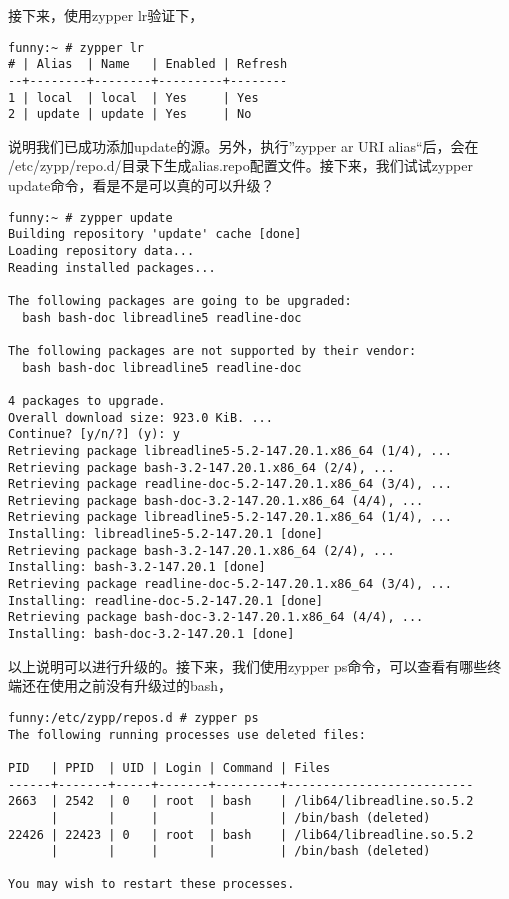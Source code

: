 接下来，使用zypper lr验证下，

\small{
\begin{verbatim}
funny:~ # zypper lr
# | Alias  | Name   | Enabled | Refresh
--+--------+--------+---------+--------
1 | local  | local  | Yes     | Yes    
2 | update | update | Yes     | No
\end{verbatim}
}
\normalsize

说明我们已成功添加update的源。另外，执行”zypper ar URI alias“后，会在
/etc/zypp/repo.d/目录下生成alias.repo配置文件。接下来，我们试试zypper
update命令，看是不是可以真的可以升级？

\small{
\begin{verbatim}
funny:~ # zypper update
Building repository 'update' cache [done]
Loading repository data...
Reading installed packages...

The following packages are going to be upgraded:
  bash bash-doc libreadline5 readline-doc 

The following packages are not supported by their vendor:
  bash bash-doc libreadline5 readline-doc 

4 packages to upgrade.
Overall download size: 923.0 KiB. ...
Continue? [y/n/?] (y): y
Retrieving package libreadline5-5.2-147.20.1.x86_64 (1/4), ...
Retrieving package bash-3.2-147.20.1.x86_64 (2/4), ...
Retrieving package readline-doc-5.2-147.20.1.x86_64 (3/4), ...
Retrieving package bash-doc-3.2-147.20.1.x86_64 (4/4), ...
Retrieving package libreadline5-5.2-147.20.1.x86_64 (1/4), ...
Installing: libreadline5-5.2-147.20.1 [done]
Retrieving package bash-3.2-147.20.1.x86_64 (2/4), ...
Installing: bash-3.2-147.20.1 [done]
Retrieving package readline-doc-5.2-147.20.1.x86_64 (3/4), ...
Installing: readline-doc-5.2-147.20.1 [done]
Retrieving package bash-doc-3.2-147.20.1.x86_64 (4/4), ...
Installing: bash-doc-3.2-147.20.1 [done]
\end{verbatim}
}
\normalsize

以上说明可以进行升级的。接下来，我们使用zypper ps命令，可以查看有哪些终
端还在使用之前没有升级过的bash，

\small{
\begin{verbatim}
funny:/etc/zypp/repos.d # zypper ps
The following running processes use deleted files:

PID   | PPID  | UID | Login | Command | Files                    
------+-------+-----+-------+---------+--------------------------
2663  | 2542  | 0   | root  | bash    | /lib64/libreadline.so.5.2
      |       |     |       |         | /bin/bash (deleted)      
22426 | 22423 | 0   | root  | bash    | /lib64/libreadline.so.5.2
      |       |     |       |         | /bin/bash (deleted)      

You may wish to restart these processes.
\end{verbatim}
}
\normalsize

